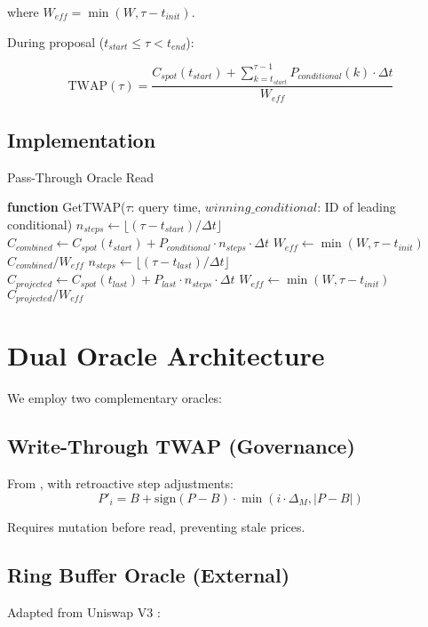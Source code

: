 \documentclass{article}
\begin{document}
where $W_{eff} = \min(W, \tau - t_{init})$.

During proposal ($t_{start} \leq \tau < t_{end}$):

$$\text{TWAP}(\tau) = \frac{C_{spot}(t_{start}) + \sum_{k=t_{start}}^{\tau-1} P_{conditional}(k) \cdot \Delta t}{W_{eff}}$$

\subsection{Implementation}

\begin{algorithm}
\caption{Pass-Through Oracle Read}
\begin{algorithmic}
\STATE \textbf{function} GetTWAP($\tau$: query time, $winning\_conditional$: ID of leading conditional)
    \STATE $n_{steps} \gets \lfloor(\tau - t_{start}) / \Delta t\rfloor$
    \STATE $C_{combined} \gets C_{spot}(t_{start}) + P_{conditional} \cdot n_{steps} \cdot \Delta t$
    \STATE $W_{eff} \gets \min(W, \tau - t_{init})$
    \RETURN $C_{combined} / W_{eff}$
\ELSE
    \STATE $n_{steps} \gets \lfloor(\tau - t_{last}) / \Delta t\rfloor$
    \STATE $C_{projected} \gets C_{spot}(t_{last}) + P_{last} \cdot n_{steps} \cdot \Delta t$
    \STATE $W_{eff} \gets \min(W, \tau - t_{init})$
    \RETURN $C_{projected} / W_{eff}$
\ENDIF
\end{algorithmic}
\end{algorithm}

\section{Dual Oracle Architecture}

We employ two complementary oracles:

\subsection{Write-Through TWAP (Governance)}
From \cite{twap2025}, with retroactive step adjustments:
$$P'_i = B + \text{sign}(P-B) \cdot \min(i \cdot \Delta_M, |P-B|)$$

Requires mutation before read, preventing stale prices.

\subsection{Ring Buffer Oracle (External)}
Adapted from Uniswap V3 \cite{uniswapv3}:
\end{document}
